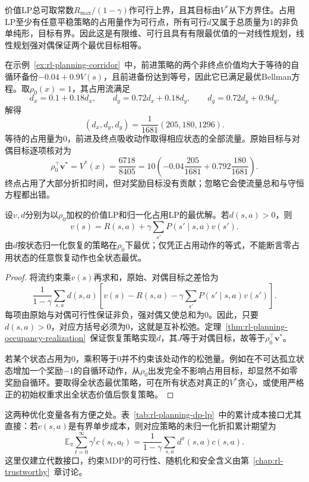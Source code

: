 价值LP总可取常数$R_{\max}/(1-\gamma)$作可行上界，且其目标由$V^*$从下方界住。占用LP至少有任意平稳策略的占用量作为可行点，所有可行$d$又属于总质量为1的非负单纯形，目标有界。因此这是有限维、可行且具有有限最优值的一对线性规划，线性规划强对偶保证两个最优目标相等。

在示例~\ref{ex:rl-planning-corridor}~中，前进策略的两个非终点价值均大于等待的自循环备份$-0.04+0.9V(s)$，且前进备份达到等号，因此它已满足最优Bellman方程。取$\rho_0(x)=1$，其占用流满足
\[
 d_x=0.1+0.18d_x,\qquad
 d_y=0.72d_x+0.18d_y,\qquad
 d_g=0.72d_y+0.9d_g.
\]
解得
\[
 (d_x,d_y,d_g)=\frac{1}{1681}(205,180,1296).
\]
等待的占用量为0，前进及终点吸收动作取得相应状态的全部流量。原始目标与对偶目标逐项核对为
\[
 \rho_0^\top\bm v^*=V^*(x)=\frac{6718}{8405}
 =10\left(-0.04\frac{205}{1681}
           +0.792\frac{180}{1681}\right).
\]
终点占用了大部分折扣时间，但对奖励目标没有贡献；忽略它会使流量总和与守恒方程都出错。

\begin{theorem}[互补松弛与最优动作]
 \label{thm:rl-planning-complementarity}
 设$v,d$分别为以$\rho_0$加权的价值LP和归一化占用LP的最优解。若$d(s,a)>0$，则
 \[
 v(s)=R(s,a)+\gamma\sum_{s'}P(s'\mid s,a)v(s').
 \]
 由$d$按状态归一化恢复的策略在$\rho_0$下最优；仅凭正占用动作的等式，不能断言零占用状态的任意恢复动作也全状态最优。
\end{theorem}
\begin{proof}
 将流约束乘$v(s)$再求和，原始、对偶目标之差恰为
 \[
 \frac{1}{1-\gamma}\sum_{s,a}d(s,a)
 \left[v(s)-R(s,a)-\gamma\sum_{s'}P(s'\mid s,a)v(s')\right].
 \]
 每项由原始与对偶可行性保证非负，强对偶又使总和为0。因此，只要$d(s,a)>0$，对应方括号必须为0，这就是互补松弛。定理~\ref{thm:rl-planning-occupancy-realization}~保证恢复策略实现$d$，其$J$等于对偶目标，故等于$\rho_0^\top\bm v^*$。

 若某个状态占用为0，乘积等于0并不约束该处动作的松弛量。例如在不可达孤立状态增加一个奖励$-1$的自循环动作，从$\rho_0$出发完全不影响占用目标，却显然不如零奖励自循环。要取得全状态最优策略，可在所有状态对真正的$V^*$贪心，或使用严格正的初始权重求出全状态价值后恢复策略。
\end{proof}

这两种优化变量各有方便之处。表~\ref{tab:rl-planning-dp-lp}~中的累计成本接口尤其直接：若$c(s,a)$是有界单步成本，则对应策略的未归一化折扣累计期望为
\[
 \mathbb E_\pi\sum_{t=0}^{\infty}\gamma^t c(s_t,a_t)
 =\frac{1}{1-\gamma}\sum_{s,a}d^\pi(s,a)c(s,a).
\]
这里仅建立代数接口，约束MDP的可行性、随机化和安全含义由第~\ref{chap:rl-trustworthy}~章讨论。

